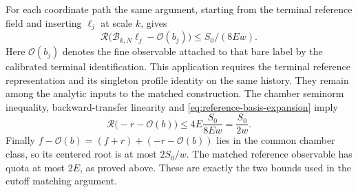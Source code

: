For each coordinate path the same argument, starting from the
terminal reference field and inserting $\ell_j$ at scale $k$,
gives
\[
 \mathcal R\bigl(\mathcal B_{k,N}\ell_j-\mathcal O(b_j)\bigr)
                                         \le S_0/(8Ew).
\]
Here $\mathcal O(b_j)$ denotes the fine observable attached to
that bare label by the calibrated terminal identification.
This application requires the terminal reference representation
and its singleton profile identity on the same history.
They remain among the analytic inputs to the matched construction.
The chamber seminorm inequality, backward-transfer linearity
and \eqref{eq:reference-basis-expansion} imply
\[
           \mathcal R\bigl(-r-\mathcal O(b)\bigr)
                  \le4E\frac{S_0}{8Ew}=\frac{S_0}{2w}.
\]
Finally $f-\mathcal O(b)=(f+r)+(-r-\mathcal O(b))$ lies in
the common chamber class, so its centered root is at most
$2S_0/w$. The matched reference observable has quota at most
$2E$, as proved above. These are exactly the two bounds used
in the cutoff matching argument.
